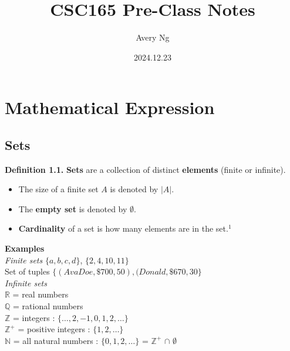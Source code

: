 \documentclass{article}
\title{CSC165 Pre-Class Notes}
\author{Avery Ng}
\date{2024.12.23}
\begin{document}
\maketitle

\section{Mathematical Expression}
\subsection{Sets}

\setlength{\parindent}{0pt}
    

\textbf{Definition 1.1.} \textbf{Sets} are a collection of distinct \textbf{elements} (finite or infinite). 
\begin{itemize}[itemsep=0pt] 
    \renewcommand{\labelitemi}{} %
    \footnotesize %
    \item The size of a finite set $A$ is denoted by $\lvert A \rvert$.
    \item The \textbf{empty set} is denoted by $\emptyset$.
    \item \textbf{Cardinality} of a set is how many elements
are in the set.$^{1}$
\end{itemize}


\textbf{Examples}\\
\emph{Finite sets } \hfill $\{a, b, c, d\}$, $\{2, 4, 10, 11\}$ \\
Set of tuples \hfill $\{(Ava Doe, \$ 700, 50), (Donald,\$ 670, 30\}$ \\
\emph{Infinite sets} \\
$ \mathbb{R} $  = real numbers \\
$ \mathbb{Q} $ = rational numbers \\
$ \mathbb{Z}$ = integers : $ \{\ldots, 2, -1, 0, 1, 2, \ldots\} $ \\
$ \mathbb{Z}^{+} $ = positive integers : $ \{1, 2, \ldots\} $ \\
$ \mathbb{N} $ = all natural numbers : $\{ 0, 1, 2, \ldots \} $ = $ \mathbb{Z}^{+} $  $\cap$ {$\emptyset$}\\

\end{document}
